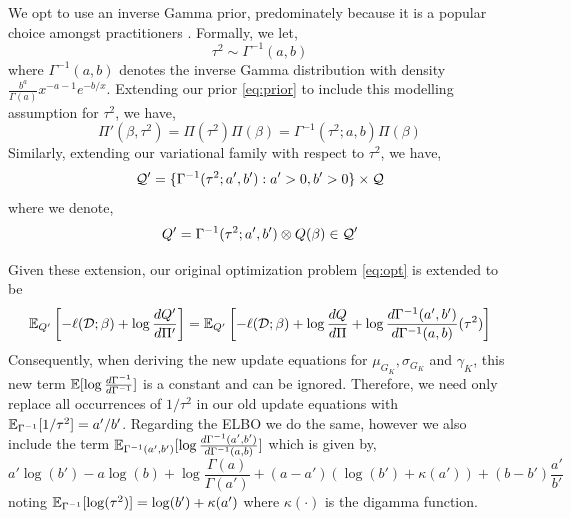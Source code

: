 \documentclass[12pt]{article}
\begin{document}
We opt to use an inverse Gamma prior, predominately because it is a popular choice amongst practitioners \citep{Browne2006}. Formally, we let,
\begin{equation}
    \tau^2 \sim \Gamma^{-1}(a, b)
\end{equation}
where $\Gamma^{-1}(a, b)$ denotes the inverse Gamma distribution with density $\frac{b^a}{\Gamma(a)}x^{-a-1} e^{-b/x}$. Extending our prior \eqref{eq:prior} to include this modelling assumption for $\tau^2$, we have,
\begin{equation}
    \Pi'(\beta, \tau^2) = \Pi(\tau^2) \Pi(\beta) = \Gamma^{-1}(\tau^2; a, b) \Pi(\beta)
\end{equation}
Similarly, extending our variational family with respect to $\tau^2$, we have,
\begin{equation}
    \mathcal{Q}' = \{ \Gamma^{-1}(\tau^2; a', b') : a' > 0, b' > 0 \} \times \mathcal{Q}
\end{equation}
where we denote,
\begin{equation}
    Q' = \Gamma^{-1}(\tau^2; a', b') \otimes Q(\beta) \in \mathcal{Q}' 
\end{equation}

Given these extension, our original optimization problem \eqref{eq:opt} is extended to be
\begin{equation}
    \mathbb{E}_{Q'} \left[ -\ell(\mathcal{D}; \beta) + \log \frac{dQ'}{d\Pi'} \right] = 
    \mathbb{E}_{Q'} \left[ -\ell(\mathcal{D}; \beta) + \log \frac{dQ}{d\Pi} + \log \frac{d\Gamma^{-1}(a', b')}{d \Gamma^{-1}(a, b)}(\tau^2)\right]
\end{equation}
Consequently, when deriving the new update equations for $\mu_{G_K}, \sigma_{G_K}$ and $\gamma_K$, this new term $ \mathbb{E} [ \log \frac{d\Gamma^{-1}}{d\Gamma^{-1}} ] $ is a constant and can be ignored. Therefore, we need only replace all occurrences of $1/\tau^2$ in our old update equations with $\mathbb{E}_{\Gamma^{-1}} [ 1 / \tau^2 ] = a'/b' $. Regarding the ELBO we do the same, however we also include the term $ \mathbb{E}_{\Gamma^{-1}(a', b')} [ \log \frac{d\Gamma^{-1}(a', b')}{d\Gamma^{-1}(a, b)}]$ which is given by,
\begin{equation}
    a' \log (b') - a \log(b) + \log \frac{\Gamma(a)}{\Gamma(a')} + (a-a')(\log(b') + \kappa(a')) + (b - b')\frac{a'}{b'}
\end{equation}
noting $\mathbb{E}_{\Gamma^{-1}} [ \log(\tau^2) ] =  \log(b') + \kappa(a') $  where $\kappa(\cdot)$ is the digamma function. 
\end{document}
